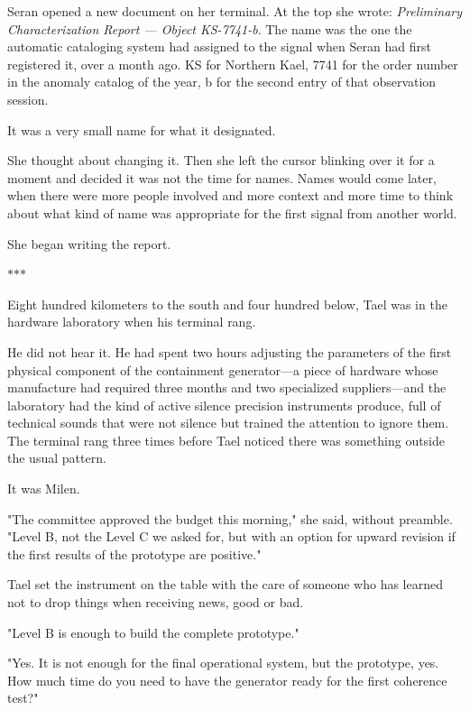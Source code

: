 \documentclass[11pt,a5paper,twoside]{book}
\begin{document}
Seran opened a new document on her terminal. At the top she wrote: \textit{Preliminary Characterization Report — Object KS-7741-b}. The name was the one the automatic cataloging system had assigned to the signal when Seran had first registered it, over a month ago. KS for Northern Kael, 7741 for the order number in the anomaly catalog of the year, b for the second entry of that observation session.

It was a very small name for what it designated.

She thought about changing it. Then she left the cursor blinking over it for a moment and decided it was not the time for names. Names would come later, when there were more people involved and more context and more time to think about what kind of name was appropriate for the first signal from another world.

She began writing the report.

\vspace{1.5em}
\begin{center}$\ast$\quad$\ast$\quad$\ast$\end{center}
\vspace{1.5em}

Eight hundred kilometers to the south and four hundred below, Tael was in the hardware laboratory when his terminal rang.

He did not hear it. He had spent two hours adjusting the parameters of the first physical component of the containment generator—a piece of hardware whose manufacture had required three months and two specialized suppliers—and the laboratory had the kind of active silence precision instruments produce, full of technical sounds that were not silence but trained the attention to ignore them. The terminal rang three times before Tael noticed there was something outside the usual pattern.

It was Milen.

"The committee approved the budget this morning," she said, without preamble. "Level B, not the Level C we asked for, but with an option for upward revision if the first results of the prototype are positive."

Tael set the instrument on the table with the care of someone who has learned not to drop things when receiving news, good or bad.

"Level B is enough to build the complete prototype."

"Yes. It is not enough for the final operational system, but the prototype, yes. How much time do you need to have the generator ready for the first coherence test?"
\end{document}
